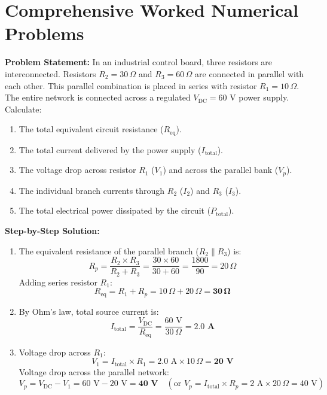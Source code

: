 \section{Comprehensive Worked Numerical Problems}

\begin{tcolorbox}[colback=white,colframe=navyblue,title=\textbf{Problem 1: DC Series-Parallel Circuit Analysis and Power Dissipation}]
\textbf{Problem Statement:} In an industrial control board, three resistors are interconnected. Resistors $R_2 = 30\,\Omega$ and $R_3 = 60\,\Omega$ are connected in parallel with each other. This parallel combination is placed in series with resistor $R_1 = 10\,\Omega$. The entire network is connected across a regulated $V_{\text{DC}} = 60\text{ V}$ power supply. Calculate:
\begin{enumerate}[label=(\alph*),leftmargin=*]
    \item The total equivalent circuit resistance ($R_{\text{eq}}$).
    \item The total current delivered by the power supply ($I_{\text{total}}$).
    \item The voltage drop across resistor $R_1$ ($V_1$) and across the parallel bank ($V_p$).
    \item The individual branch currents through $R_2$ ($I_2$) and $R_3$ ($I_3$).
    \item The total electrical power dissipated by the circuit ($P_{\text{total}}$).
\end{enumerate}
\textbf{Step-by-Step Solution:}
\begin{enumerate}[label=(\alph*),leftmargin=*]
    \item The equivalent resistance of the parallel branch ($R_2 \parallel R_3$) is:
    \[
    R_p = \frac{R_2 \times R_3}{R_2 + R_3} = \frac{30 \times 60}{30 + 60} = \frac{1800}{90} = 20\,\Omega
    \]
    Adding series resistor $R_1$:
    \[
    R_{\text{eq}} = R_1 + R_p = 10\,\Omega + 20\,\Omega = \mathbf{30\,\Omega}
    \]
    \item By Ohm's law, total source current is:
    \[
    I_{\text{total}} = \frac{V_{\text{DC}}}{R_{\text{eq}}} = \frac{60\text{ V}}{30\,\Omega} = \mathbf{2.0\text{ A}}
    \]
    \item Voltage drop across $R_1$:
    \[
    V_1 = I_{\text{total}} \times R_1 = 2.0\text{ A} \times 10\,\Omega = \mathbf{20\text{ V}}
    \]
    Voltage drop across the parallel network:
    \[
    V_p = V_{\text{DC}} - V_1 = 60\text{ V} - 20\text{ V} = \mathbf{40\text{ V}} \quad (\text{or } V_p = I_{\text{total}} \times R_p = 2\text{ A} \times 20\,\Omega = 40\text{ V})
\]
\end{enumerate}
\end{tcolorbox}
